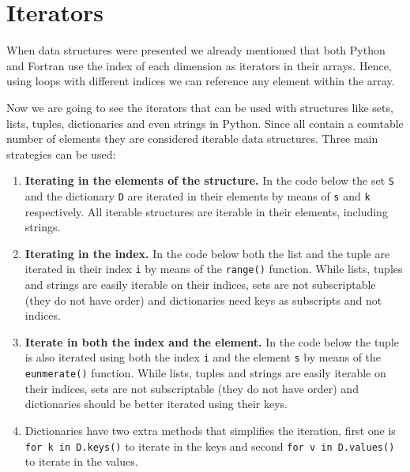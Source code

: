       
      
      

        
        
        
        
        







        \newpage
    \section{Iterators}
        
        When data structures were presented we already mentioned that both Python and Fortran 
        use the index of each dimension as iterators in their arrays. 
        Hence, using loops with different indices we can reference any element within the array.
        
        Now we are going to see the iterators that can be used with structures like 
        sets, lists, tuples, dictionaries and even strings in Python.    
        Since all contain a countable number of elements they are considered iterable data structures. 
        Three main strategies can be used:
        \begin{enumerate}
            \item \textbf{Iterating in the elements of the structure.} 
            In the code below the set \texttt{S} and the dictionary \texttt{D} are iterated in their elements
            by means of \texttt{s} and \texttt{k} respectively. 
            All iterable structures are iterable in their elements, including strings.  
            \item \textbf{Iterating in the index.}
            In the code below both the list and the tuple are iterated in their index \texttt{i} by means of the \texttt{range()} function.
            While lists, tuples and strings are easily iterable on their indices, 
            sets are not subscriptable (they do not have order) and 
            dictionaries need keys as subscripts and not indices. 
            \item \textbf{Iterate in both the index and the element.} 
            In the code below the tuple is also iterated using both the index \texttt{i} and the element \texttt{s} 
            by means of the \texttt{eunmerate()} function.
            While lists, tuples and strings are easily iterable on their indices, 
            sets are not subscriptable (they do not have order) and 
            dictionaries should be better iterated using their keys.
            
            \item Dictionaries have two extra methods that simplifies the iteration, first one is 
            \texttt{for k in D.keys()} to iterate in the keys 
            and second \texttt{for v in D.values()} to iterate in the values. 
        \end{enumerate} 
        
